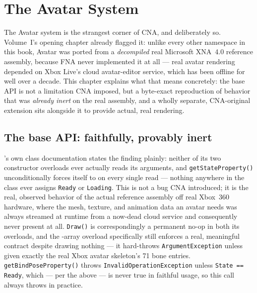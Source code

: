 \chapter{The Avatar System}
\label{ch:avatar}

The Avatar system is the strangest corner of CNA, and deliberately so. Volume~I's opening
chapter already flagged it: unlike every other namespace in this book, Avatar was ported from
a \emph{decompiled} real Microsoft XNA~4.0 reference assembly, because FNA never implemented
it at all --- real avatar rendering depended on Xbox Live's cloud avatar-editor service, which
has been offline for well over a decade. This chapter explains what that means concretely:
the base API is not a limitation CNA imposed, but a byte-exact reproduction of behavior that
was \emph{already inert} on the real assembly, and a wholly separate, CNA-original extension
sits alongside it to provide actual, real rendering.

\section{The base API: faithfully, provably inert}

's own class documentation states the finding plainly: neither of
its two constructor overloads ever actually reads its arguments, and
\texttt{getStateProperty()} unconditionally forces itself to
 on every single read --- nothing anywhere in the
class ever assigns \texttt{Ready} or \texttt{Loading}. This is not a bug CNA introduced; it is
the real, observed behavior of the actual reference assembly off real Xbox~360 hardware,
where the mesh, texture, and animation data an avatar needs was always streamed at runtime
from a now-dead cloud service and consequently never present at all. \texttt{Draw()} is
correspondingly a permanent no-op in both its overloads, and the -array
overload specifically still enforces a real, meaningful contract despite drawing nothing ---
it hard-throws \texttt{ArgumentException} unless given exactly the real Xbox avatar
skeleton's 71 bone entries. \texttt{getBindPoseProperty()} throws
\texttt{InvalidOperationException} unless \texttt{State == Ready}, which --- per the above ---
is never true in faithful usage, so this call always throws in practice.


